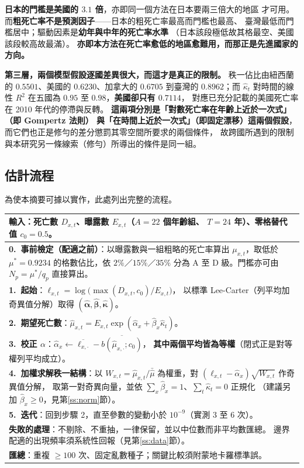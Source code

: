 \documentclass[UTF8, fontset=macnew, a4paper, 12pt]{ctexart}
\begin{document}
\textbf{日本的門檻是美國的 $3.1$ 倍}，亦即同一個方法在日本要兩三倍大的地區
才可用。而\textbf{粗死亡率不是預測因子}——日本的粗死亡率最高而門檻也最高、
臺灣最低而門檻居中；驅動因素是\textbf{幼年與中年的死亡率水準}
（日本該段極低故其格最空、美國該段較高故最滿）。
\textbf{亦即本方法在死亡率愈低的地區愈難用，而那正是先進國家的方向。}

\textbf{第三層，兩個模型假設逐國差異很大，而這才是真正的限制。}
秩一佔比由紐西蘭的 $0.5501$、美國的 $0.6230$、加拿大的 $0.6705$
到臺灣的 $0.8962$；而 $\hat\kappa_t$ 對時間的線性 $R^2$ 在五國為
$0.95$ 至 $0.98$，\textbf{美國卻只有 $0.7114$}，
對應已充分記載的美國死亡率在 2010 年代的停滯與反轉。
\textbf{這兩項分別是「對數死亡率在年齡上近於一次式」（即 Gompertz 法則）
與「在時間上近於一次式」（即固定漂移）這兩個假設}，
而它們也正是修勻的差分懲罰其零空間所要求的兩個條件，
故跨國所遇到的限制與本研究另一條線索（修勻）所導出的條件是同一組。

\subsection{估計流程}\label{ss:algo}

為使本摘要可據以實作，此處列出完整的流程。

\begin{table}[H]
\centering
\small
\begin{tabular}{p{}}
\toprule
\textbf{輸入}：死亡數 $D_{x,t}$、曝露數 $E_{x,t}$（$A=22$ 個年齡組、
$T=24$ 年）、零格替代值 $c_0=0.5$。\\
\midrule
\textbf{0.\ 事前檢定（配適之前）}：以曝露數與一組粗略的死亡率算出
$\mu_{x,t}$，取低於 $\mu^{\ast}=0.9234$ 的格數佔比，依 $2\%$／$15\%$／$35\%$
分為 A 至 D 級。門檻亦可由 $N_p=\mu^{\ast}/q_p$ 直接算出。\\
\textbf{1.\ 起始}：$\ell_{x,t}=\log\big(\max(D_{x,t},c_0)/E_{x,t}\big)$，
以標準 Lee-Carter（列平均加奇異值分解）取得
$(\hat{\boldsymbol\alpha},\hat{\boldsymbol\beta},\hat{\boldsymbol\kappa})$。\\
\textbf{2.\ 期望死亡數}：$\hat\mu_{x,t}
=E_{x,t}\exp(\hat\alpha_x+\hat\beta_x\hat\kappa_t)$。\\
\textbf{3.\ 校正 $\alpha$}：$\hat\alpha_x\leftarrow
\overline{\ell_{x,\cdot}}-\overline{b(\hat\mu_{x,\cdot};c_0)}$，
\textbf{其中兩個平均皆為等權}（閉式正是對等權列平均成立）。\\
\textbf{4.\ 加權求解秩一結構}：以 $W_{x,t}=\hat\mu_{x,t}/\bar{\hat\mu}$
為權重，對 $(\ell_{x,t}-\hat\alpha_x)\sqrt{W_{x,t}}$ 作奇異值分解，
取第一對奇異向量，並依 $\sum_x\hat\beta_x=1$、$\sum_t\hat\kappa_t=0$ 正規化
（建議另加 $\hat\beta_x\ge0$，見第\ref{ss:norm}節）。\\
\textbf{5.\ 迭代}：回到步驟 2，直至參數的變動小於 $10^{-9}$（實測 3 至 6 次）。\\
\midrule
\textbf{失敗的處理}：不剔除、不重抽，一律保留，並以中位數而非平均數匯總。
邊界配適的出現頻率須系統性回報（見第\ref{ss:data}節）。\\
\textbf{匯總}：重複 $\ge100$ 次、固定亂數種子；關鍵比較須附蒙地卡羅標準誤。\\
\bottomrule
\end{tabular}
\end{table}
\end{document}
